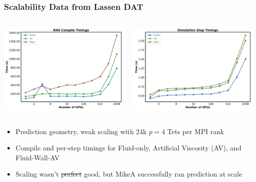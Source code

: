 \begin{frame}\frametitle{Scalability Data from Lassen DAT}
    \begin{columns}[T]  %

    \begin{column}{0.5\textwidth}
    \centering
    \includegraphics[width=\textwidth]{Figures/mtc/RHSCompileTimes_2048.pdf}
    \end{column}
    
    \begin{column}{0.5\textwidth}
    \centering
      \includegraphics[width=\textwidth]{Figures/mtc/SimulationStepTimes_2048.pdf}
    \end{column}

  \end{columns}
  \begin{center}
  \begin{itemize}
  \item Prediction geometry, weak scaling with 24k $p=4$ Tets per MPI rank
  \item Compile and per-step timings for Fluid-only, Artificial Viscosity (AV), and Fluid-Wall-AV
  \item Scaling wasn't \sout{perfect} good, but MikeA successfully ran prediction at scale
  \end{itemize}
  \end{center}
\end{frame}


